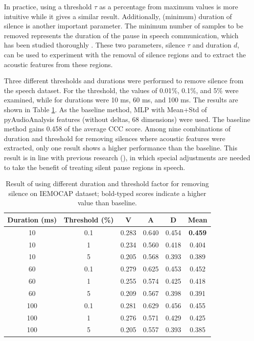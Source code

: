 In practice, using a threshold $\tau$ as a percentage from maximum values is
more intuitive while it gives a similar result. Additionally, (minimum)
duration of silence is another important parameter. The minimum number of
samples to be removed represents the duration of the pause in speech
communication, which has been studied thoroughly \cite{Campione2002}. These two
parameters, silence $\tau$ and duration $d$, can be used to experiment with 
the removal of silence regions and to extract the acoustic features from these
regions.

Three different thresholds and durations were performed to remove silence from
the speech dataset. For the threshold, the values of 0.01\%, 0.1\%, and 5\%
were examined, while for durations were 10 ms, 60 ms, and 100 ms. The results
are shown in Table \ref{tab:sil_remove_ie}. As the baseline method, MLP with
Mean+Std of pyAudioAnalysis features (without deltas, 68 dimensions) were used.
The baseline method gains 0.458 of the average CCC score. Among nine
combinations of duration and threshold for removing silences where acoustic
features were extracted, only one result shows a higher performance than the
baseline. This result is in line with previous research (\cite{Atmaja2019,
Tian2015a, Aguilar2020,Fayek2017}), in which special adjustments are needed to
take the benefit of treating silent pause regions in speech.

\begin{table}
\caption{Result of using different duration and threshold factor for removing
silence on IEMOCAP dataset; bold-typed scores indicate a higher value than
baseline.}
  \begin{center}
  \begin{tabular}{c | c | c c c c}
    \hline
Duration (ms)   & Threshold (\%) &  V & A & D & Mean \\
\hline \hline
10  & 0.1 & 0.283 & 0.640 & 0.454 & \textbf{0.459} \\
10  & 1   & 0.234 & 0.560 & 0.418 & 0.404 \\
10  & 5   & 0.205 & 0.568 & 0.393 & 0.389 \\
60  & 0.1 & 0.279 & 0.625 & 0.453 & 0.452 \\
60  & 1   & 0.255 & 0.574 & 0.425 & 0.418 \\
60  & 5   & 0.209 & 0.567 & 0.398 & 0.391 \\
100 & 0.1 & 0.281 & 0.629 & 0.456 & 0.455 \\
100 & 1   & 0.276 & 0.571 & 0.429 & 0.425 \\
100 & 5   & 0.205 & 0.557 & 0.393 & 0.385 \\
    \hline
  \end{tabular}
  \label{tab:sil_remove_ie}
  \end{center}
\end{table}


